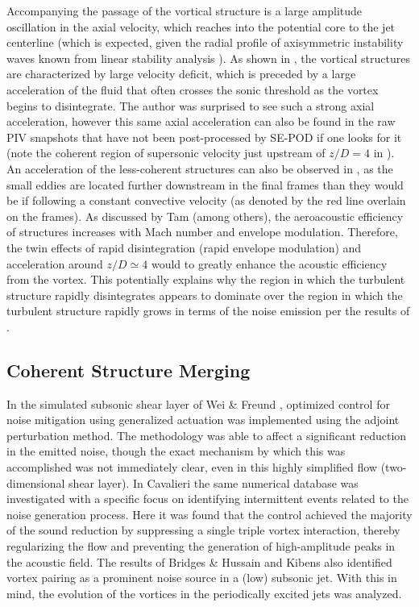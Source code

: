 Accompanying the passage of the vortical structure is a large amplitude oscillation in the axial velocity, which reaches into the potential core to the jet centerline (which is expected, given the radial profile of axisymmetric instability waves known from linear stability analysis \citep{Michalke1965}).
As shown in , the vortical structures are characterized by large velocity deficit, which is preceded by a large acceleration of the fluid that often crosses the sonic threshold as the vortex begins to disintegrate.
The author was surprised to see such a strong axial acceleration, however this same axial acceleration can also be found in the raw PIV snapshots that have not been post-processed by SE-POD if one looks for it (note the coherent region of supersonic velocity just upstream of $z/D = 4$ in ).
An acceleration of the less-coherent structures can also be observed in , as the small eddies are located further downstream in the final frames than they would be if following a constant convective velocity (as denoted by the red line overlain on the frames).
As discussed by Tam \citep{Tam1996} (among others), the aeroacoustic efficiency of structures increases with Mach number and envelope modulation.
Therefore, the twin effects of rapid disintegration (\ie rapid envelope modulation) and acceleration around $z/D \simeq 4$ would to greatly enhance the acoustic efficiency from the vortex.
This potentially explains why the region in which the turbulent structure rapidly disintegrates appears to dominate over the region in which the turbulent structure rapidly grows in terms of the noise emission per the results of .

\subsection{Coherent Structure Merging}
In the simulated subsonic shear layer of Wei \& Freund \citep{Wei2006}, optimized control for noise mitigation using generalized actuation was implemented using the adjoint perturbation method.
The methodology was able to affect a significant reduction in the emitted noise, though the exact mechanism by which this was accomplished was not immediately clear, even in this highly simplified flow (two-dimensional shear layer).
In Cavalieri \etal \cite{Cavalieri2010b} the same numerical database was investigated with a specific focus on identifying intermittent events related to the noise generation process.
Here it was found that the control achieved the majority of the sound reduction by suppressing a single triple vortex interaction, thereby regularizing the flow and preventing the generation of high-amplitude peaks in the acoustic field.
The results of Bridges \& Hussain \citep{Bridges1992} and Kibens \citep{Kibens1980} also identified vortex pairing as a prominent noise source in a (low) subsonic jet.
With this in mind, the evolution of the vortices in the periodically excited jets was analyzed.

